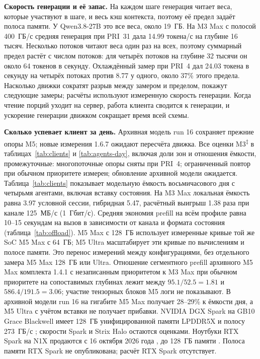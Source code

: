 \textbf{Скорость генерации и её запас.} На каждом шаге генерация читает веса, которые участвуют в шаге, и весь кэш
контекста, поэтому её предел задаёт полоса памяти. У Qwen3.8-27B это все веса, около 19~ГБ. На M3 Max с полосой 400~ГБ/с средняя генерация при PRI~31 дала 14.99 токена/с на глубине 16 тысяч. Несколько потоков читают веса один раз на всех, поэтому суммарный
предел растёт с числом потоков: для четырёх потоков на глубине 32 тысячи он около 64 токенов в секунду. Охлаждённый замер при PRI~4 дал 24.03 токена в секунду на четырёх потоках против 8.77 у одного,
около 37\% этого предела. Насколько движки сократят разрыв между замером и пределом, покажут следующие замеры;
расчёты используют измеренную скорость генерации. Когда чтение порций уходит на сервер, работа клиента
сводится к генерации, и ускорение генерации движком сокращает время всей схемы.

\textbf{Сколько успевает клиент за день.} Архивная модель run 16 сохраняет прежние опоры M5; новые измерения 1.6.7 ожидают пересчёта движка. Все оценки M3\textsuperscript{‡} в таблицах~\ref{tab:clients} и \ref{tab:agents-day}, включая доли зон и отношения ёмкости, промежуточные: многопоточные опоры сняты при PRI~4; ограниченный повтор при обычном приоритете измерен; обновление архивной модели ожидается. Таблица~\ref{tab:clients} показывает модельную ёмкость
восьмичасового дня с четырьмя агентами, включая вставку состояния. На M3 Max локальная ёмкость
равна 3.97 условной сессии, гибридная 5.47, расчётный выигрыш 1.38 раза при канале 125~МБ/с (1~Гбит/с). Средняя экономия prefill на всём профиле равна 10--15 секундам на вызов в зависимости от канала и формата состояния
(таблица~\ref{tab:offload}). M5 Max с 128~ГБ использует измеренные кривые той же SoC M5 Max с 64~ГБ;
M5 Ultra масштабирует эти кривые по вычислениям и полосе памяти. Это перенос измерений между
конфигурациями, без отдельного замера M5 Max 128~ГБ или Ultra. Отношение сегментного prefill архивного M5 Max комплекта 1.4.1 с незаписанным приоритетом к M3 Max при обычном приоритете
на сопоставимых глубинах лежит между $95.1/52.5=1.81$ и $586.4/191.5=3.06$;
участие тензорных блоков M5 логи не показывают. В архивной модели run 16 на гигабите M5 Max получает 28--29\% к ёмкости дня, а M5 Ultra с учётом вставки не получает прибавки.
NVIDIA DGX Spark на GB10 Grace Blackwell имеет 128~ГБ унифицированной памяти LPDDR5X
и полосу 273~ГБ/с \cite{nvidiadgxspark}; скорости Spark и Strix Halo остаются оценками.
Ноутбуки RTX Spark на N1X продаются с 16 октября 2026 года \cite{nvidiartxsparknews},
до 128~ГБ памяти \cite{nvidiartxspark}. Полоса памяти RTX Spark не опубликована;
расчёт RTX Spark отсутствует.

